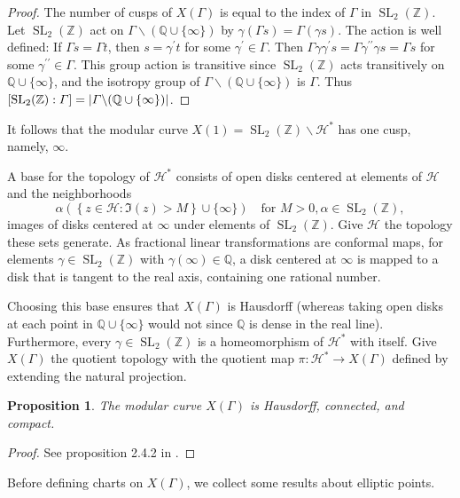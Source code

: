 \documentclass[10pt,leqno,twoside,b5paper]{article}
\theoremstyle{plain}
\newtheorem{proposition}[lem]{Proposition}
\theoremstyle{definition}
\numberwithin{equation}{section}
\numberwithin{lem}{section}
\newcommand{\cbr}[1]{\left\{#1\right\}}
\DeclareMathOperator{\SL}{SL}
\newcommand{\slz}{\SL_2(\mathbb{Z})}
\begin{document}
\begin{proof}
    The number of cusps of $X(\varGamma)$ is equal to the index of $\varGamma$ in $\slz$. Let $\slz$ act on $\varGamma\backslash(\mathbb Q \cup \{\infty\})$ by $\gamma(\varGamma s) = \varGamma (\gamma s)$. The action is well defined: If $\varGamma s = \varGamma t$, then $s = \gamma^\prime t$ for some $\gamma^\prime \in \varGamma$. Then $\varGamma \gamma\gamma^\prime s = \varGamma\gamma^{\prime\prime}\gamma s = \varGamma s$ for some $\gamma^{\prime\prime}\in\varGamma$. This group action is transitive since $\slz$ acts transitively on $\mathbb Q \cup \{\infty\}$, and the isotropy group of $\varGamma\backslash(\mathbb Q \cup \{\infty\})$ is $\varGamma$. Thus $[\slz:\varGamma] = \abs{\varGamma\backslash (\mathbb Q\cup \{\infty\})}$.
\end{proof}

It follows that the modular curve $X(1) = \slz\backslash \mathcal H^\ast$ has one cusp, namely, $\infty$.

A base for the topology of $\mathcal H^\ast$ consists of open disks centered at elements of $\mathcal H$ and the neighborhoods 
\[\alpha(\cbr{z\in\mathcal H : \Im(z) > M}\cup\{\infty\})\quad \text{for $M>0,\alpha\in\slz$},\] images of disks centered at $\infty$ under elements of $\slz$. Give $\mathcal H$ the topology these sets generate. As fractional linear transformations are conformal maps, for elements $\gamma\in\slz$ with $\gamma(\infty)\in\mathbb Q$, a disk centered at $\infty$ is mapped to a disk that is tangent to the real axis, containing one rational number.

Choosing this base ensures that $X(\varGamma)$ is Hausdorff (whereas taking open disks at each point in $\mathbb Q \cup \{\infty\}$ would not since $\mathbb Q$ is dense in the real line). Furthermore, every $\gamma\in \slz$ is a homeomorphism of $\mathcal H^\ast$ with itself. Give $X(\varGamma)$ the quotient topology with the quotient map $\pi\colon \mathcal H^\ast\to X(\varGamma)$ defined by extending the natural projection.

\begin{proposition}
    The modular curve $X(\varGamma)$ is Hausdorff, connected, and compact. 
\end{proposition}
\begin{proof}
    See proposition 2.4.2 in \cite{diamond}.
\end{proof}

Before defining charts on $X(\varGamma)$, we collect some results about elliptic points.
\end{document}
